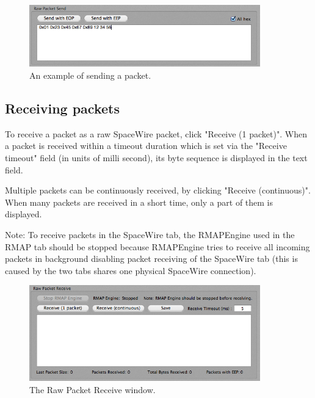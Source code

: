 \documentclass[a4paper,10pt]{article}
\begin{document}
\begin{figure}[htb]
\begin{center}
\includegraphics[width=10cm]{figures/SpaceWireRMAPGUI/SpaceWireSection_RawPacketSend_withData.png}
\vspace{-2mm}
\caption{An example of sending a packet.}
\label{figure:SpaceWireSection_RawPacketSend_withData}
\end{center}
\end{figure}


\subsection{Receiving packets}
To receive a packet as a raw SpaceWire packet, click "Receive (1 packet)". When a packet is received within a timeout duration which is set via the "Receive timeout" field (in units of milli second), its byte sequence is displayed in the text field.

Multiple packets can be continuously received, by clicking "Receive (continuous)".
When many packets are received in a short time, only a part of them is displayed. 

Note: To receive packets in the SpaceWire tab, the RMAPEngine used in the RMAP tab should be stopped because RMAPEngine tries to receive all incoming packets in background disabling packet receiving of the SpaceWire tab (this is caused by the two tabs shares one physical SpaceWire connection).


\begin{figure}[htb]
\begin{center}
\includegraphics[width=10cm]{figures/SpaceWireRMAPGUI/SpaceWireSection_RawPacketReceiveSection.png}
\vspace{-2mm}
\caption{The Raw Packet Receive window.}
\label{figure:SpaceWireSection_RawPacketReceiveSection}
\end{center}
\end{figure}
\end{document}
